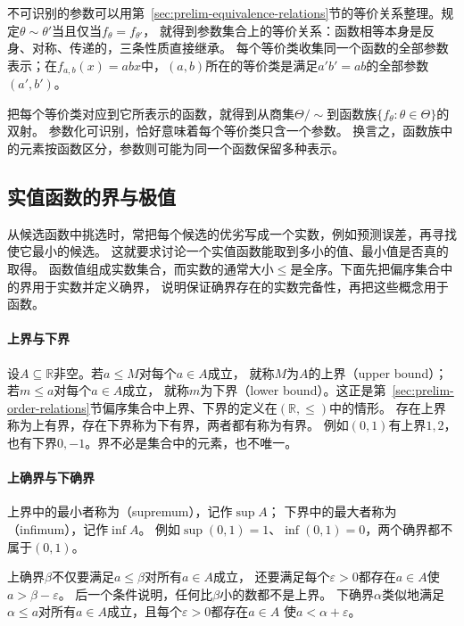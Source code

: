 不可识别的参数可以用第~\ref{sec:prelim-equivalence-relations}节的等价关系整理。规定$\theta\sim\theta'$当且仅当$f_\theta=f_{\theta'}$，
就得到参数集合上的等价关系：函数相等本身是反身、对称、传递的，三条性质直接继承。
每个等价类收集同一个函数的全部参数表示；在$f_{a,b}(x)=abx$中，$(a,b)$所在的等价类是满足$a'b'=ab$的全部参数$(a',b')$。

把每个等价类对应到它所表示的函数，就得到从商集$\Theta/{\sim}$到函数族$\{f_\theta:\theta\in\Theta\}$的双射。
参数化可识别，恰好意味着每个等价类只含一个参数。
换言之，函数族中的元素按函数区分，参数则可能为同一个函数保留多种表示。

\subsection{实值函数的界与极值}
\label{sec:prelim-optimal-values-errors}

从候选函数中挑选时，常把每个候选的优劣写成一个实数，例如预测误差，再寻找使它最小的候选。
这就要求讨论一个实值函数能取到多小的值、最小值是否真的取得。
函数值组成实数集合，而实数的通常大小$\leq$是全序。下面先把偏序集合中的界用于实数并定义确界，
说明保证确界存在的实数完备性，再把这些概念用于函数。

\paragraph{上界与下界}
设$A\subseteq\mathbb R$非空。若$a\leq M$对每个$a\in A$成立，
就称$M$为$A$的上界（upper bound）；若$m\leq a$对每个$a\in A$成立，
就称$m$为下界（lower bound）。这正是第~\ref{sec:prelim-order-relations}节偏序集合中上界、下界的定义在$(\mathbb R,\leq)$中的情形。
存在上界称为上有界，存在下界称为下有界，两者都有称为有界。
例如$(0,1)$有上界$1,2$，也有下界$0,-1$。界不必是集合中的元素，也不唯一。

\paragraph{上确界与下确界}
上界中的最小者称为（supremum），记作$\sup A$；
下界中的最大者称为（infimum），记作$\inf A$。
例如$\sup(0,1)=1$、$\inf(0,1)=0$，两个确界都不属于$(0,1)$。

上确界$\beta$不仅要满足$a\leq\beta$对所有$a\in A$成立，
还要满足每个$\varepsilon>0$都存在$a\in A$使$a>\beta-\varepsilon$。
后一个条件说明，任何比$\beta$小的数都不是上界。
下确界$\alpha$类似地满足$\alpha\leq a$对所有$a\in A$成立，且每个$\varepsilon>0$都存在$a\in A$
使$a<\alpha+\varepsilon$。

